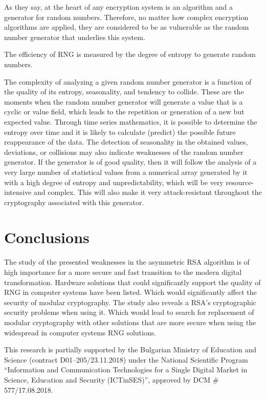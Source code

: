 \documentclass[graybox]{svmult}
\begin{document}
As they say, at the heart of any encryption system is an algorithm and a generator for random numbers. Therefore, no matter how complex encryption algorithms are applied, they are considered to be as vulnerable as the random number generator that underlies this system.

The efficiency of RNG is measured by the degree of entropy to generate random numbers.

The complexity of analyzing a given random number generator is a function of the quality of its entropy, seasonality, and tendency to collide. These are the moments when the random number generator will generate a value that is a cyclic or value field, which leads to the repetition or generation of a new but expected value. Through time series mathematics, it is possible to determine the entropy over time and it is likely to calculate (predict) the possible future reappearance of the data. The detection of seasonality in the obtained values, deviations, or collisions may also indicate weaknesses of the random number generator. If the generator is of good quality, then it will follow the analysis of a very large number of statistical values from a numerical array generated by it with a high degree of entropy and unpredictability, which will be very resource-intensive and complex. This will also make it very attack-resistant throughout the cryptography associated with this generator.

\section{Conclusions}
\label{sec:3}

The study of the presented weaknesses in the asymmetric RSA algorithm is of high importance for a more secure and fast transition to the modern digital transformation. Hardware solutions that could significantly support the quality of RNG in computer systems have been listed. Which would significantly affect the security of modular cryptography. The study also reveals a RSA's cryptographic security problems when using it. Which would lead to search for replacement of modular cryptography with other solutions that are more secure when using the widespread in computer systems RNG solutions.

\begin{acknowledgement}
This research is partially supported by the Bulgarian Ministry of Education and Science (contract D01–205/23.11.2018) under the National Scientific Program ``Information and Communication Technologies for a Single Digital Market in Science, Education and Security (ICTinSES)'', approved by DCM \# 577/17.08.2018.
\end{acknowledgement}


\end{document}
